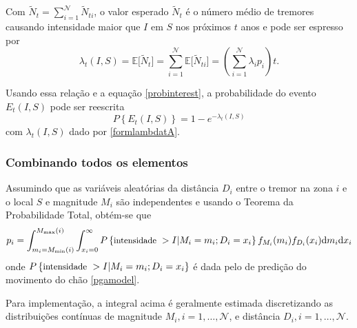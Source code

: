 Com $\tilde N_t=\sum_{i=1}^{\mathcal{N}} \tilde N_{t i}$,
o valor esperado $\tilde N_t$ é o número médio de tremores causando intensidade maior que $I$ em $S$
 nos próximos $t$ anos e pode ser espresso por
\begin{equation} \label{formlambdatA}
\lambda_t(I, S)=\mathbb{E}\Big[ \tilde N_t \Big] =\sum_{i=1}^{\mathcal{N}} \mathbb{E}\Big[ \tilde N_{t i}\Big] =
\left( \sum_{i=1}^{\mathcal{N}} \lambda_i p_i \right) t.
\end{equation}

Usando essa relação e a equação \eqref{probinterest}, a probabilidade do evento $E_t(I, S)$
pode ser reescrita
\begin{equation}
P \left\{   E_t(I, S) \right\} =1-e^{-\lambda_t(I, S)}
\end{equation}
com $\lambda_t(I, S)$ dado por \eqref{formlambdatA}.


\subsubsection{Combinando todos os elementos}

Assumindo que as variáveis aleatórias da distância $D_i$ entre o tremor na zona $i$ e o local $S$ e magnitude $M_i$
são independentes e usando o Teorema da Probabilidade Total, obtém-se que
\begin{equation}
p_i= \displaystyle \int_{m_i =M_{\min}(i)}^{M_{\max}(i)}
\int_{x_i =0}^{\infty}  P \left\{ \mbox{\small intensidade \normalsize }>I| M_i = m_i; D_i = x_i \right\}f_{M_i}(m_i) f_{D_i}( x_i )
\mathrm{d}m_i \mathrm{d}x_i
\end{equation}
onde $P \left\{ \mbox{\small intensidade \normalsize }>I| M_i = m_i; D_i = x_i \right\}$
é dada pelo de predição do movimento do chão \eqref{pgamodel}.

Para implementação, a integral acima é geralmente estimada discretizando as distribuições contínuas de
magnitude $M_i, i=1,\ldots, \mathcal{N}$, e distância $D_i, i=1,\ldots, \mathcal{N}$.

